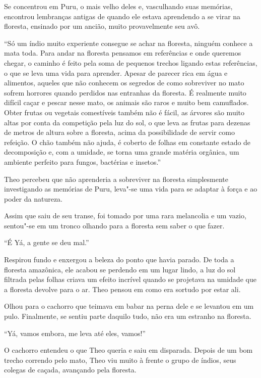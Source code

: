 Se concentrou em Puru, o mais velho deles e, vasculhando suas memórias,
encontrou lembranças antigas de quando ele estava aprendendo a se virar
na floresta, ensinado por um ancião, muito provavelmente seu avô.

``Só um índio muito experiente consegue se achar na floresta, ninguém
conhece a mata toda. Para andar na floresta pensamos em referências e
onde queremos chegar, o caminho é feito pela soma de pequenos trechos
ligando estas referências, o que se leva uma vida para aprender. Apesar
de parecer rica em água e alimentos, aqueles que não conhecem os
segredos de como sobreviver no mato sofrem horrores quando perdidos nas
entranhas da floresta. É realmente muito difícil caçar e pescar nesse
mato, os animais são raros e muito bem camuflados. Obter frutas ou
vegetais comestíveis também não é fácil, as árvores são muito altas por
conta da competição pela luz do sol, o que leva as frutas para dezenas
de metros de altura sobre a floresta, acima da possibilidade de servir
como refeição. O chão também não ajuda, é coberto de folhas em constante
estado de decomposição e, com a umidade, se torna uma grande matéria
orgânica, um ambiente perfeito para fungos, bactérias e insetos.''

Theo percebeu que não aprenderia a sobreviver na floresta simplesmente
investigando as memórias de Puru, leva"-se uma vida para se adaptar à
força e ao poder da natureza.

Assim que saiu de seu transe, foi tomado por uma rara melancolia e um
vazio, sentou"-se em um tronco olhando para a floresta sem saber o que
fazer.

``É Yá, a gente se deu mal.''

Respirou fundo e enxergou a beleza do ponto que havia parado. De toda a
floresta amazônica, ele acabou se perdendo em um lugar lindo, a luz do
sol filtrada pelas folhas criava um efeito incrível quando se projetava
na umidade que a floresta devolve para o ar. Theo pensou em como era
sortudo por estar ali.

Olhou para o cachorro que teimava em babar na perna dele e se levantou
em um pulo. Finalmente, se sentiu parte daquilo tudo, não era um
estranho na floresta.

``Yá, vamos embora, me leva até eles, vamos!''

O cachorro entendeu o que Theo queria e saiu em disparada. Depois de um
bom trecho correndo pelo mato, Theo viu muito à frente o grupo de
índios, seus colegas de caçada, avançando pela floresta.

